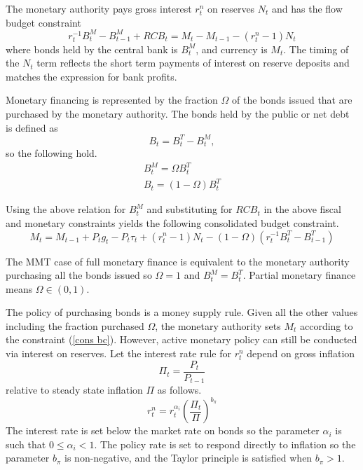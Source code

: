 \documentclass[]{article}
\begin{document}
The monetary authority pays gross interest $r_{t}^{n}$ on reserves $N_{t}$ and has the flow budget constraint%
\begin{equation}
 r_{t}^{-1}B_{t}^{M}-B_{t-1}^{M}+RCB_{t}=M_{t}-M_{t-1}-(r_{t}^{n}-1)N_{t}
 \label{CB BC}
\end{equation}
where bonds held by the central bank is $B_{t}^{M}$, and currency is $M_{t}$. The timing of the $N_{t}$ term reflects the short term payments of interest on reserve deposits and matches the expression for bank profits.

Monetary financing is represented by the fraction $\Omega$ of the bonds issued that are purchased by the monetary authority. The bonds held by the public or net debt is defined as
\[
B_{t}=B_{t}^{T}-B_{t}^{M},
\]
so the following hold.
\begin{eqnarray}
 B_{t}^{M}=\Omega B_{t}^{T} \\
 B_{t}=(1-\Omega) B_{t}^{T} \label{net debt}
\end{eqnarray}

Using the above relation for $B_{t}^{M}$ and substituting for $RCB_{t}$ in the above fiscal and monetary constraints yields the following consolidated budget constraint.%
\begin{equation}
M_{t}=M_{t-1}+P_{t}g_{t}-P_{t}\tau _{t}+(r_{t}^{n}-1)N_{t}-(1-\Omega)(r_{t}^{-1}B_{t}^{T}-B_{t-1}^{T})
\label{cons bc}
\end{equation}

The MMT case of full monetary finance is equivalent to the monetary authority purchasing all the bonds issued so $\Omega=1$ and $B_{t}^{M}=B_{t}^{T}$. Partial monetary finance means $\Omega\in(0,1)$.

The policy of purchasing bonds is a money supply rule. Given all the other values including the fraction purchased $\Omega$, the monetary authority sets $M_{t}$ according to the constraint (\ref{cons bc}). However, active monetary policy can still be conducted via interest on reserves. Let the interest rate rule for $r^{n}_{t}$ depend on gross inflation
\[
\Pi_{t}=\frac{P_{t}}{P_{t-1}}
\]
relative to steady state inflation $\Pi$ as follows.
\begin{equation} \label{ior}
    r^{n}_{t}=r_{t}^{\alpha_{i}}\left(\frac{\Pi_{t}}{\Pi}\right)^{b_{\pi}}
\end{equation}
The interest rate is set below the market rate on bonds so the parameter $\alpha_{i}$ is such that $0\leq\alpha_{i}<1$. The policy rate is set to respond directly to inflation so the parameter $b_{\pi}$ is non-negative, and the Taylor principle is satisfied when $b_{\pi}>1$. 
\end{document}
